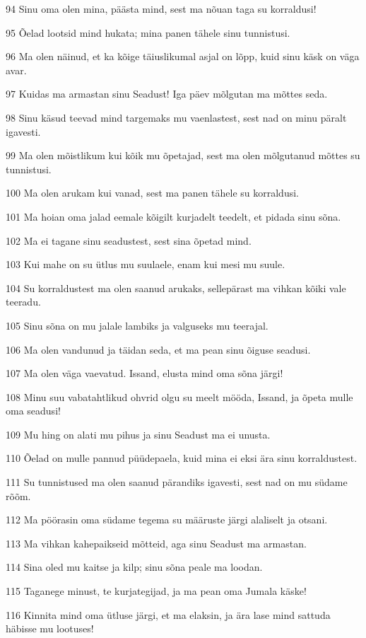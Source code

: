 \par 94 Sinu oma olen mina, päästa mind, sest ma nõuan taga su korraldusi!
\par 95 Õelad lootsid mind hukata; mina panen tähele sinu tunnistusi.
\par 96 Ma olen näinud, et ka kõige täiuslikumal asjal on lõpp, kuid sinu käsk on väga avar.
\par 97 Kuidas ma armastan sinu Seadust! Iga päev mõlgutan ma mõttes seda.
\par 98 Sinu käsud teevad mind targemaks mu vaenlastest, sest nad on minu päralt igavesti.
\par 99 Ma olen mõistlikum kui kõik mu õpetajad, sest ma olen mõlgutanud mõttes su tunnistusi.
\par 100 Ma olen arukam kui vanad, sest ma panen tähele su korraldusi.
\par 101 Ma hoian oma jalad eemale kõigilt kurjadelt teedelt, et pidada sinu sõna.
\par 102 Ma ei tagane sinu seadustest, sest sina õpetad mind.
\par 103 Kui mahe on su ütlus mu suulaele, enam kui mesi mu suule.
\par 104 Su korraldustest ma olen saanud arukaks, sellepärast ma vihkan kõiki vale teeradu.
\par 105 Sinu sõna on mu jalale lambiks ja valguseks mu teerajal.
\par 106 Ma olen vandunud ja täidan seda, et ma pean sinu õiguse seadusi.
\par 107 Ma olen väga vaevatud. Issand, elusta mind oma sõna järgi!
\par 108 Minu suu vabatahtlikud ohvrid olgu su meelt mööda, Issand, ja õpeta mulle oma seadusi!
\par 109 Mu hing on alati mu pihus ja sinu Seadust ma ei unusta.
\par 110 Õelad on mulle pannud püüdepaela, kuid mina ei eksi ära sinu korraldustest.
\par 111 Su tunnistused ma olen saanud pärandiks igavesti, sest nad on mu südame rõõm.
\par 112 Ma pöörasin oma südame tegema su määruste järgi alaliselt ja otsani.
\par 113 Ma vihkan kahepaikseid mõtteid, aga sinu Seadust ma armastan.
\par 114 Sina oled mu kaitse ja kilp; sinu sõna peale ma loodan.
\par 115 Taganege minust, te kurjategijad, ja ma pean oma Jumala käske!
\par 116 Kinnita mind oma ütluse järgi, et ma elaksin, ja ära lase mind sattuda häbisse mu lootuses!
